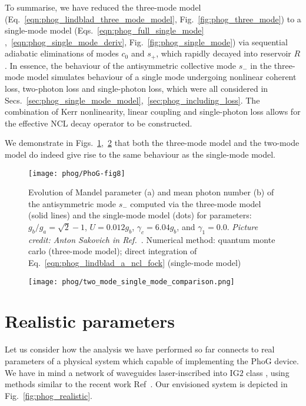 To summarise, we have reduced the three-mode model (Eq.~\ref{eqn:phog_lindblad_three_mode_model}, Fig.~\ref{fig:phog_three_mode}) to a single-mode model (Eqs.~\ref{eqn:phog_full_single_mode}
,~\ref{eqn:phog_single_mode_deriv}, Fig.~\ref{fig:phog_single_mode}) via sequential adiabatic eliminations of modes $c_0$ and $s_+$, which rapidly decayed into reservoir $R$. In essence, the behaviour of the antisymmetric collective mode $s_-$ in the three-mode model simulates behaviour of a single mode undergoing nonlinear coherent loss, two-photon loss and single-photon loss, which were all considered in Secs.~\ref{sec:phog_single_mode_model},~\ref{sec:phog_including_loss}. The combination of Kerr nonlinearity, linear coupling and single-photon loss allows for the effective NCL decay operator to be constructed.

We demonstrate in Figs.~\ref{fig:phog_three_mode_single_mode_comparison},~\ref{fig:phog_two_mode_single_mode_comparison} that both the three-mode model and the two-mode model do indeed give rise to the same behaviour as the single-mode model.


\begin{figure}[htp]
\centering
\texttt{[image: phog/PhoG-fig8]}
\caption{\label{fig:phog_three_mode_single_mode_comparison}
Evolution of Mandel parameter (a) and mean photon number (b) of the antisymmetric mode $s_-$ computed via the three-mode model (solid lines) and the single-mode model (dots) for parameters: $g_b / g_a = \sqrt{2} - 1$, $U = 0.012 g_b$, $\gamma_c = 6.04 g_b$, and $\gamma_1 = 0.0$. \emph{Picture credit: Anton Sakovich in Ref.~\cite{Thornton2019a}}. Numerical method: quantum monte carlo (three-mode model); direct integration of Eq.~\ref{eqn:phog_lindblad_a_ncl_fock} (single-mode model)}
\end{figure}

\begin{figure}[htp]
\centering
\texttt{[image: phog/two\_mode\_single\_mode\_comparison.png]}
\caption{\label{fig:phog_two_mode_single_mode_comparison} }
\end{figure}

\clearpage
\section{Realistic parameters}\label{sec:parameters}

Let us consider how the analysis we have performed so far connects to real parameters of a physical system which capable of implementing the PhoG device. We have in mind a network of waveguides laser-inscribed into IG$2$ class \cite{ig2}, using methods similar to the recent work Ref~\cite{Mukherjee2017}. Our envisioned system is depicted in Fig.~\ref{fig:phog_realistic}.

